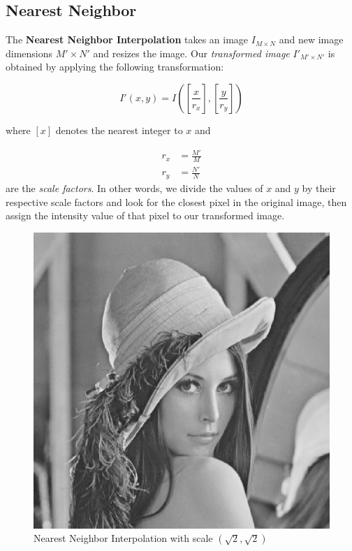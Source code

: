 \subsection{Nearest Neighbor} \label{subsec:nearest-neighbor}

The \textbf{Nearest Neighbor Interpolation} takes an image $I_{M\times N}$ and new image dimensions $M'\times N'$ and resizes the image. Our \textit{transformed image} $I'_{M'\times N'}$ is obtained by applying the following transformation:

\[I'(x, y)=I\left(\left[\frac{x}{r_x}\right], \left[\frac{y}{r_y}\right]\right)\]

where $[x]$ denotes the nearest integer to $x$ and

\begin{align*} r_x &= \frac{M'}{M}\\
               r_y &= \frac{N'}{N}
\end{align*} are the \textit{scale factors}. In other words, we divide the values of $x$ and $y$ by their respective scale factors and look for the closest pixel in the original image, then assign the intensity value of that pixel to our transformed image. 

\begin{figure}[H]
    \centering
    \includegraphics[scale=0.5]{images/lenna-nearest-neighbor.png}
    \caption{Nearest Neighbor Interpolation with scale $(\sqrt{2}, \sqrt{2})$}
    \label{fig:lenna-nearest-neighbor}
\end{figure}